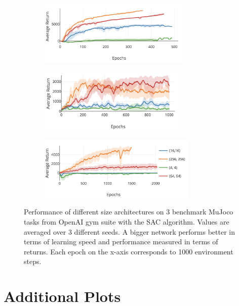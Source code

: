 \begin{figure}[ht]
    \begin{subfigure}[t]{0.30\textwidth}
        \centering
        \includegraphics[height=1.2in]{images/cheetah_sizes.png}
        \caption{}
    \end{subfigure}%
    \begin{subfigure}[t]{0.30\textwidth}
        \centering
        \includegraphics[height=1.2in]{images/hopper_sizes.png}
        \caption{}
    \end{subfigure}
    \begin{subfigure}[t]{0.39\textwidth}
        \centering
        \includegraphics[height=1.2in]{images/ant_sizes.png}
        \caption{}
    \end{subfigure}
    \caption{\label{fig:size_sac}Performance of different size architectures on 3 benchmark MuJoco tasks from OpenAI gym suite with the SAC algorithm. Values are averaged over 3 different seeds. A bigger network performs better in terms of learning speed and performance measured in terms of returns. Each epoch on the x-axis corresponds to 1000 environment steps.}
\end{figure}

\section{Additional Plots}

